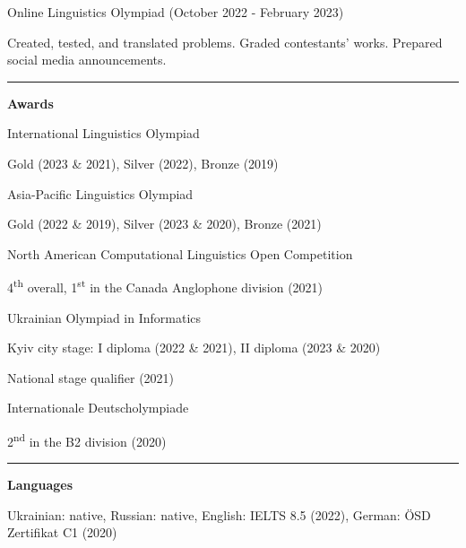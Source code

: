 \documentclass[12pt]{article}
\begin{document}
\quad \small{Online Linguistics Olympiad (October 2022 - February 2023)}

\vspace{4pt}

\quad \small{Created, tested, and translated problems. Graded contestants' works. Prepared social media announcements.}

\vspace{8pt}

\hrule

\vspace{16pt}

\large{\textbf{Awards}}

\vspace{8pt}

\normalsize{International Linguistics Olympiad}

\quad \small{Gold (2023 \& 2021), Silver (2022), Bronze (2019)}

\vspace{4pt}

\normalsize{Asia-Pacific Linguistics Olympiad}

\quad \small{Gold (2022 \& 2019), Silver (2023 \& 2020), Bronze (2021)}

\vspace{4pt}

\normalsize{North American Computational Linguistics Open Competition}

\quad \small{4\textsuperscript{th} overall, 1\textsuperscript{st} in the Canada Anglophone division (2021)}

\vspace{4pt}

\normalsize{Ukrainian Olympiad in Informatics}

\quad \small{Kyiv city stage: I diploma (2022 \& 2021), II diploma (2023 \& 2020)}

\quad \small{National stage qualifier (2021)}

\vspace{4pt}

\normalsize{Internationale Deutscholympiade}

\quad \small{2\textsuperscript{nd} in the B2 division (2020)}

\vspace{8pt}

\hrule

\vspace{16pt}

\large{\textbf{Languages}}

\vspace{8pt}

\normalsize{Ukrainian: native, Russian: native, English: IELTS 8.5 (2022), German: \"{O}SD Zertifikat C1 (2020)}
\end{document}
